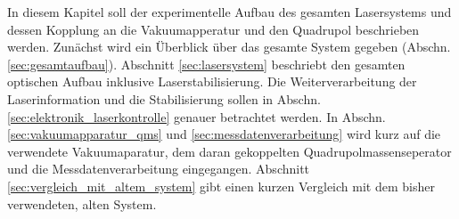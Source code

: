 In diesem Kapitel soll der experimentelle Aufbau des gesamten Lasersystems und
dessen Kopplung an die Vakuumapperatur und den Quadrupol beschrieben werden.
Zunächst wird ein Überblick über das gesamte System gegeben (Abschn.
\ref{sec:gesamtaufbau}). Abschnitt \ref{sec:lasersystem} beschriebt den gesamten
optischen Aufbau inklusive Laserstabilisierung. Die Weiterverarbeitung der
Laserinformation und die Stabilisierung sollen in Abschn.
\ref{sec:elektronik_laserkontrolle} genauer betrachtet werden. In Abschn.
\ref{sec:vakuumapparatur_qms} und \ref{sec:messdatenverarbeitung} wird kurz
auf die verwendete Vakuumaparatur, dem daran gekoppelten
Quadrupolmassenseperator und die Messdatenverarbeitung eingegangen.
Abschnitt \ref{sec:vergleich_mit_altem_system} gibt einen kurzen Vergleich mit dem
bisher verwendeten, alten System.


